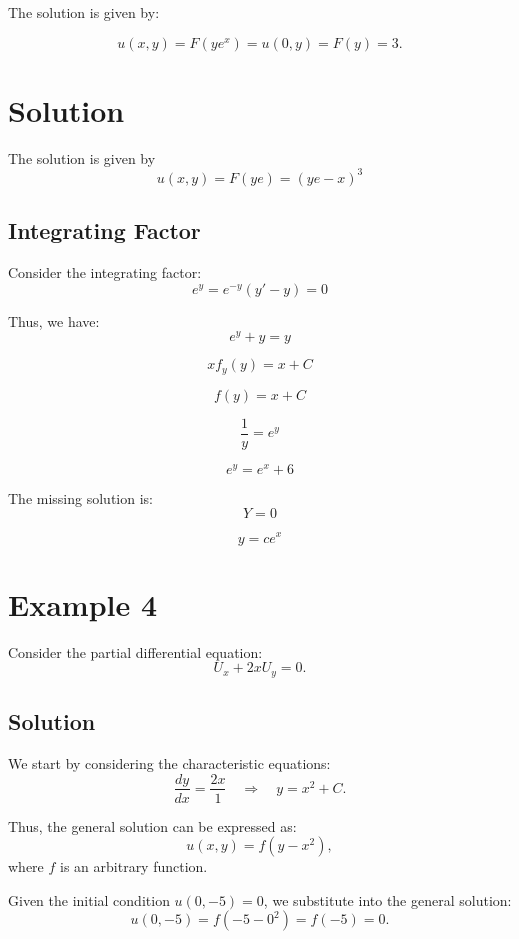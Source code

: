 \documentclass[11pt]{article}
\begin{document}
The solution is given by:

\begin{equation}
    u(x, y) = F(y e^x) = u(0, y) = F(y) = 3.
\end{equation}





\section*{Solution}

The solution is given by
\[
u(x, y) = F(ye) = (ye - x)^3
\]

\subsection*{Integrating Factor}

Consider the integrating factor:
\[
e^{y} = e^{-y} (y' - y) = 0
\]

Thus, we have:
\[
e^{y} + y = y
\]

\[
x f_y(y) = x + C
\]

\[
f(y) = x + C
\]

\[
\frac{1}{y} = e^{y}
\]

\[
e^{y} = e^{x} + 6
\]

The missing solution is:
\[
Y = 0
\]

\[
y = c e^{x}
\]





\section*{Example 4}

Consider the partial differential equation:
\[
U_x + 2x U_y = 0.
\]

\subsection*{Solution}

We start by considering the characteristic equations:
\[
\frac{dy}{dx} = \frac{2x}{1} \quad \Rightarrow \quad y = x^2 + C.
\]

Thus, the general solution can be expressed as:
\[
u(x, y) = f(y - x^2),
\]
where \( f \) is an arbitrary function.

Given the initial condition \( u(0, -5) = 0 \), we substitute into the general solution:
\[
u(0, -5) = f(-5 - 0^2) = f(-5) = 0.
\]
\end{document}
